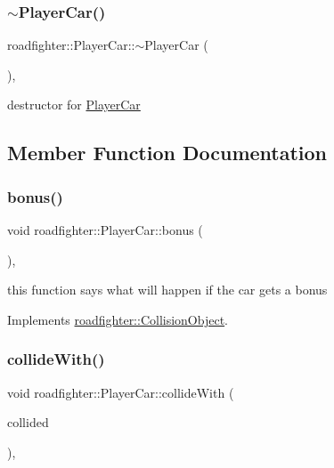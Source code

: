 \subsubsection{\texorpdfstring{$\sim$\+Player\+Car()}{~PlayerCar()}}
{\footnotesize\ttfamily roadfighter\+::\+Player\+Car\+::$\sim$\+Player\+Car (\begin{DoxyParamCaption}{ }\end{DoxyParamCaption})\hspace{0.3cm}{\ttfamily [override]}, {\ttfamily [default]}}

destructor for \hyperlink{classroadfighter_1_1PlayerCar}{Player\+Car} 

\subsection{Member Function Documentation}
\mbox{\label{classroadfighter_1_1PlayerCar_a0f0626a6ea7d25e3ba01a8289d54acac}} 
\subsubsection{\texorpdfstring{bonus()}{bonus()}}
{\footnotesize\ttfamily void roadfighter\+::\+Player\+Car\+::bonus (\begin{DoxyParamCaption}{ }\end{DoxyParamCaption})\hspace{0.3cm}{\ttfamily [override]}, {\ttfamily [virtual]}}

this function says what will happen if the car gets a bonus 

Implements \hyperlink{classroadfighter_1_1CollisionObject_a157e499c27619ceefd6179a459fafd90}{roadfighter\+::\+Collision\+Object}.

\mbox{\label{classroadfighter_1_1PlayerCar_ab62e40d949ac12f402fdaaab15c69b81}} 
\subsubsection{\texorpdfstring{collide\+With()}{collideWith()}}
{\footnotesize\ttfamily void roadfighter\+::\+Player\+Car\+::collide\+With (\begin{DoxyParamCaption}\item[{std\+::shared\+\_\+ptr$<$ \hyperlink{classroadfighter_1_1CollisionObject}{Collision\+Object} $>$ \&}]{collided }\end{DoxyParamCaption})\hspace{0.3cm}{\ttfamily [override]}, {\ttfamily [virtual]}}

